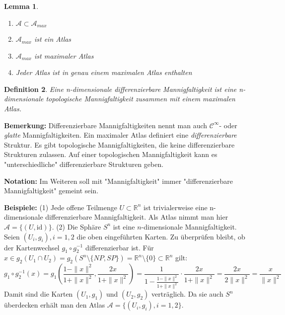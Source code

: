 \documentclass[12pt,a4paper]{article}
\def\R{\mathbb{R}}
\def\id{\mathrm{id}}
\newtheorem{Lemma}{Lemma}[section]
\newtheorem{Definition}[Lemma]{Definition}
\begin{document}
\begin{Lemma}

\begin{enumerate}
\item \quad $ \mathcal A \subset \mathcal A_{max}$
\item \quad $\mathcal A _{max}$ ist ein Atlas
\item \quad $\mathcal A _{max}$ ist maximaler Atlas
\item \quad  Jeder Atlas ist in genau einem maximalen Atlas enthalten
\end{enumerate}
\end{Lemma}

\begin{Definition}
Eine n-dimensionale {\em differenzierbare Mannigfaltigkeit} ist eine n-dimensionale topologische
Mannigfaltigkeit zusammen mit einem maximalen Atlas.
\end{Definition}

{\bf Bemerkung:}
Differenzierbare Mannigfaltigkeiten nennt man auch $\mathcal C^\infty$- oder {\it glatte} Mannigfaltigkeiten. Ein
maximaler Atlas definiert eine {\it differenzierbare} Struktur. Es gibt topologische Mannigfaltigkeiten, die keine
differenzierbare Strukturen zulassen. Auf einer topologischen Mannigfaltigkeit kann es "unterschiedliche" differenzierbare
Strukturen geben.

\medskip

{\bf Notation:} Im Weiteren soll mit "Mannigfaltigkeit" immer "differenzierbare Mannigfaltigkeit" gemeint sein.

\bigskip

{\bf Beispiele:} (1) Jede offene Teilmenge $U\subset \R^n$ ist trivialerweise eine n-dimensionale
differenzierbare Mannigfaltigkeit. Als Atlas nimmt man hier $\mathcal A = \{(U, \id)\}$.
(2) Die Sph\"are $S^n$ ist eine $n$-dimensionale Mannigfaltigkeit. Seien $(U_i, g_i), i=1,2$
die oben eingef\"uhrten Karten. Zu \"uberpr\"ufen bleibt, ob der Kartenwechsel $g_1 \circ g_2^{-1}$
differenzierbar ist. F\"ur $x\in g_2(U_1\cap U_2)= g_2(S^n\setminus \{NP, SP\})= \R^n\setminus \{0\}\subset \R^n$ gilt:
$$
g_1 \circ g_2^{-1}(x) = g_1(\frac{1-\|x\|^2}{1+\|x\|^2},\frac{2x}{1+\|x\|^2})=
\frac{1}{1-\frac{1-\|x\|^2}{1+\|x\|^2}}\cdot\frac{2x}{1+\|x\|^2}
=
\frac{2x}{2\|x\|^2} = \frac{x}{\|x\|^2}
$$
Damit sind die Karten $(U_1,g_1)$ und  $(U_2,g_2)$ vertr\"aglich. Da sie auch $S^n$ \"uberdecken erh\"alt man den
Atlas $\mathcal A = \{(U_i, g_i), i=1,2 \}$.

\bigskip
\end{document}
